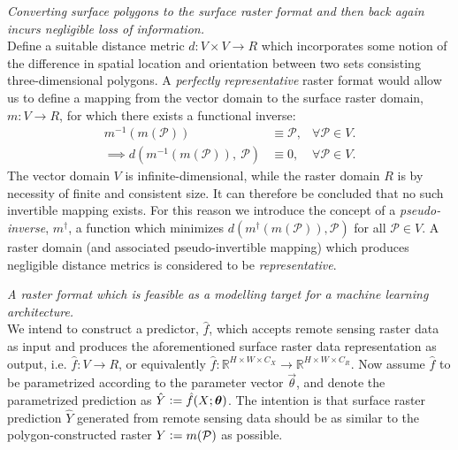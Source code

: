 \begin{description}[style=nextline]
  \item[Representative]
    \textit{Converting surface polygons to the surface raster format and then back again incurs negligible loss of information.}
    \\
    Define a suitable distance metric $d: V \times V \rightarrow{R}$ which incorporates some notion of the difference in spatial location and orientation between two sets consisting three-dimensional polygons.
    A \emph{perfectly} \textit{representative} raster format would allow us to define a mapping from the vector domain to the surface raster domain, $m: V \rightarrow R$, for which there exists a functional inverse:
    \begin{align*}
      m^{-1}\left(m(\mathcal{P})\right)
      &\equiv
      \mathcal{P},
      &\forall \mathcal{P} \in V.
      \\
      \implies d\left(
        m^{-1}(m(\mathcal{P})),~\mathcal{P}
      \right)
      &\equiv
      0,
      &\forall \mathcal{P} \in V.
    \end{align*}
    The vector domain $V$ is infinite-dimensional, while the raster domain $R$ is by necessity of finite and consistent size.
    It can therefore be concluded that no such invertible mapping exists.
    For this reason we introduce the concept of a \textit{pseudo-inverse}, $m^{\dagger}$, a function which minimizes $d(m^{\dagger}(m(\mathcal{P})), \mathcal{P})$ for all $\mathcal{P} \in V$.
    A raster domain (and associated pseudo-invertible mapping) which produces negligible distance metrics is considered to be \textit{representative}.
  \item[Targetable] 
    \textit{A raster format which is feasible as a modelling target for a machine learning architecture.}
    \\
    We intend to construct a predictor, $\hat{f}$, which accepts remote sensing raster data as input and produces the aforementioned surface raster data representation as output, i.e.  $\hat{f}: V \rightarrow R$, or equivalently
    $
      \hat{f}:
        \mathbb{R}^{H \times W \times C_X}
        \rightarrow
        \mathbb{R}^{H \times W \times C_R}
    $.
    Now assume $\hat{f}$ to be parametrized according to the parameter vector $\vec{\theta}$, and denote the parametrized prediction as $\hat{Y} \vcentcolon= \hat{f}(X; \boldsymbol{\theta})$.
    The intention is that surface raster prediction $\hat{Y}$ generated from remote sensing data should be as similar to the polygon-constructed raster $Y \vcentcolon= m(\mathcal{P})$ as possible.

\end{description}
